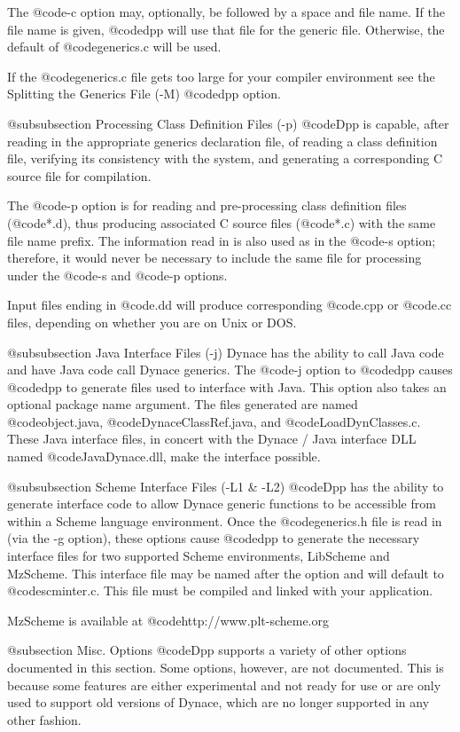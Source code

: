 The @code{-c} option may, optionally, be followed by a space and file
name.  If the file name is given, @code{dpp} will use that file for the
generic file.  Otherwise, the default of @code{generics.c} will be used.

If the @code{generics.c} file gets too large for your compiler environment
see the Splitting the Generics File (-M) @code{dpp} option.

@subsubsection Processing Class Definition Files (-p)
@code{Dpp} is capable, after reading in the appropriate generics
declaration file, of reading a class definition file, verifying
its consistency with the system, and generating a corresponding
C source file for compilation.

The @code{-p} option is for reading and pre-processing class
definition files (@code{*.d}), thus producing associated
C source files (@code{*.c}) with the same file name prefix.
The information read in is also used as in the @code{-s} option;
therefore, it would never be necessary to include the same
file for processing under the @code{-s} and @code{-p} options.

Input files ending in @code{.dd} will produce corresponding
@code{.cpp} or @code{.cc} files, depending on whether you are
on Unix or DOS.

@subsubsection Java Interface Files (-j)
Dynace has the ability to call Java code and have Java code
call Dynace generics.  The @code{-j} option to @code{dpp}
causes @code{dpp} to generate files used to interface with Java.
This option also takes an optional package name argument.
The files generated are named @code{object.java},
@code{DynaceClassRef.java}, and @code{LoadDynClasses.c}.
These Java interface files, in concert with the Dynace / Java interface DLL
named @code{JavaDynace.dll}, make the interface possible.

@subsubsection Scheme Interface Files (-L1 & -L2)
@code{Dpp} has the ability to generate interface code to allow Dynace
generic functions to be accessible from within a Scheme language
environment.  Once the @code{generics.h} file is read in (via the -g
option), these options cause @code{dpp} to generate the necessary
interface files for two supported Scheme environments, LibScheme and
MzScheme.  This interface file may be named after the option and
will default to @code{scminter.c}.  This file must be compiled and
linked with your application.

MzScheme is available at
@code{http://www.plt-scheme.org}

@subsection Misc. Options
@code{Dpp} supports a variety of other options documented in this
section.  Some options, however, are not documented.  This is because
some features are either experimental and not ready for use or are only used
to support old versions of Dynace, which are no longer supported in any
other fashion.

